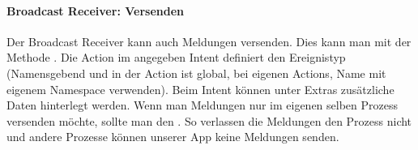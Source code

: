 \paragraph{Broadcast Receiver: Versenden} Der Broadcast Receiver kann auch Meldungen versenden. Dies kann man mit der Methode . Die Action im angegeben Intent definiert den Ereignistyp (Namensgebend und in der Action ist global, bei eigenen Actions, Name mit eigenem Namespace verwenden). Beim Intent können unter Extras zusätzliche Daten hinterlegt werden. Wenn man Meldungen nur im eigenen selben Prozess versenden möchte, sollte man den . So verlassen die Meldungen den Prozess nicht und andere Prozesse können unserer App keine Meldungen senden.
